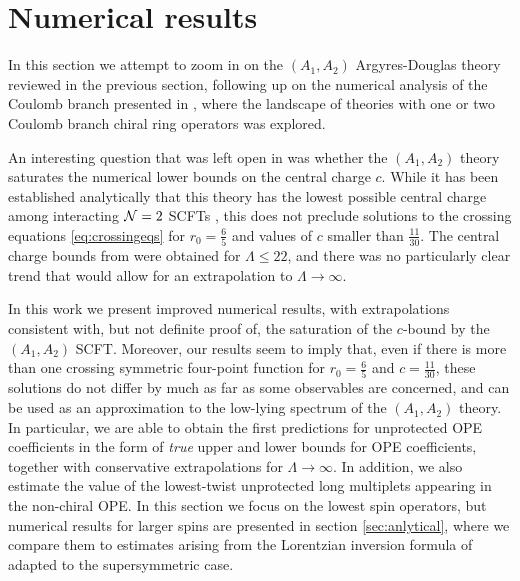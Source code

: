 \section{Numerical results}
\label{sec:numericsh0}

In this section we attempt to zoom in on the $(A_1,A_2)$ Argyres-Douglas theory reviewed in the previous section, following up on the numerical analysis of the Coulomb branch presented in \cite{Beem:2014zpa,Lemos:2015awa}, where the landscape of theories with one or two Coulomb branch chiral ring operators was explored. 

An interesting question that was left open in \cite{Lemos:2015awa} was whether the $(A_1,A_2)$ theory saturates the numerical lower bounds on the central charge $c$.
While it has been established analytically that this theory has the lowest possible central charge among interacting ${\mathcal{N}}=2$ SCFTs \cite{Liendo:2015ofa}, 
this does not preclude solutions to the crossing equations \eqref{eq:crossingeqs} for $r_0=\frac65$ and values of $c$ smaller than $\frac{11}{30}$. 
The central charge bounds from \cite{Beem:2014zpa,Lemos:2015awa} were obtained for $\Lambda \leqslant 22$, and there was no particularly clear trend that would allow for an extrapolation to $\Lambda \to \infty$.


In this work we present improved numerical results, with extrapolations consistent with, but not definite proof of, the saturation of the $c$-bound by the $(A_1,A_2)$ SCFT.
Moreover, our results seem to imply that, even if there is more than one crossing symmetric four-point function for $r_0=\frac65$ and $c=\tfrac{11}{30}$, these solutions do not differ by much as far as some observables are concerned, and can be used as an approximation to the low-lying spectrum of the $(A_1,A_2)$ theory.
In particular, we are able to obtain the first
predictions for unprotected OPE coefficients in the form of \emph{true} upper and lower bounds for OPE coefficients, together with conservative extrapolations for $\Lambda \to \infty$. In addition, we also estimate the value of the lowest-twist unprotected long multiplets appearing in the non-chiral OPE. In this section we focus on the lowest spin operators, but numerical results for larger spins are presented in section \ref{sec:anlytical}, where we compare them to  estimates arising from the Lorentzian inversion formula of \cite{Caron-Huot:2017vep} adapted to the supersymmetric case.



